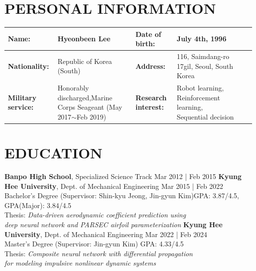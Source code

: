 \documentclass[a4paper,10pt]{extarticle}
\begin{document}
\renewcommand*{\arraystretch}{1.5}
\noindent
\section*{PERSONAL INFORMATION}
\begin{center}
    \vspace*{-0.8cm}
    \noindent
    \begin{longtable}{LRLRLR}
        \textbf{Name:}             & Hyeonbeen Lee                                                                          & \textbf{Date of birth:}     & July 4th, 1996                                              \\
        \hline
        \textbf{Nationality:}      & Republic of Korea (South)                                                              & \textbf{Address:}           & 116, Saimdang-ro 17gil, Seoul, South Korea                  \\
        \hline
        \textbf{Military service:} & Honorably discharged,\linebreak Marine Corps Seageant \small{(May 2017$\sim$Feb 2019)} & \textbf{Research interest:} & Robot learning, Reinforcement learning, Sequential decision \\
        \hline
    \end{longtable}
\end{center}

\section*{EDUCATION}
\noindent
\textbf{Banpo High School}, Specialized Science Track \hfill Mar 2012 | Feb 2015
\newline
\textbf{Kyung Hee University}, Dept. of Mechanical Engineering \hfill Mar 2015 | Feb 2022\\ %
Bachelor's Degree (Supervisor: Shin-kyu Jeong, Jin-gyun Kim)\hfill GPA: 3.87/4.5, GPA(Major): 3.84/4.5\\ %
Thesis: \textit{\small{Data-driven aerodynamic coefficient prediction using}}\\
\hspace*{1.3cm}\textit{\small{deep neural
        network and PARSEC airfoil parameterization}}
\newline
\textbf{Kyung Hee University}, Dept. of Mechanical Engineering \hfill Mar 2022 | Feb 2024\\ %
Master's Degree (Supervisor: Jin-gyun Kim) \hfill GPA: 4.33/4.5\\ %
Thesis: \textit{\small{Composite neural network with differential propagation}}\\
\hspace*{1.3cm}\textit{\small{for modeling impulsive nonlinear dynamic systems}}
\end{document}
